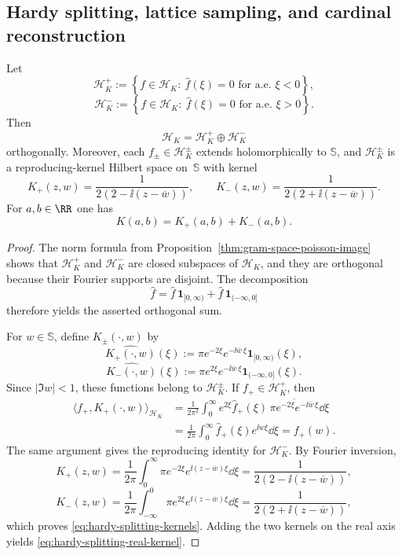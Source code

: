 \subsection{Hardy splitting, lattice sampling, and cardinal reconstruction}

\begin{proposition}%
\label{prop:poisson-hardy-splitting}
Let
\[
\mathcal H_K^+
:=
\left\{
f\in\mathcal H_K:\ \widehat f(\xi)=0 \text{ for a.e. }\xi<0
\right\},
\]
\[
\mathcal H_K^-
:=
\left\{
f\in\mathcal H_K:\ \widehat f(\xi)=0 \text{ for a.e. }\xi>0
\right\}.
\]
Then
\[
\mathcal H_K=\mathcal H_K^+\oplus \mathcal H_K^-
\]
orthogonally.  Moreover, each $f_\pm\in\mathcal H_K^\pm$ extends
holomorphically to $\mathbb S$, and $\mathcal H_K^\pm$ is a
reproducing-kernel Hilbert space on~$\mathbb S$ with kernel
\begin{equation}\label{eq:hardy-splitting-kernels}
K_+(z,w)=\frac{1}{2(2-\ii(z-\overline w))},
\qquad
K_-(z,w)=\frac{1}{2(2+\ii(z-\overline w))}.
\end{equation}
For $a,b\in\RR$ one has
\begin{equation}\label{eq:hardy-splitting-real-kernel}
K(a,b)=K_+(a,b)+K_-(a,b).
\end{equation}
\end{proposition}

\begin{proof}
The norm formula from Proposition~\ref{thm:gram-space-poisson-image}
shows that $\mathcal H_K^+$ and $\mathcal H_K^-$ are closed subspaces of
$\mathcal H_K$, and they are orthogonal because their Fourier supports are
disjoint.  The decomposition
\[
\widehat f
=\widehat f\,\mathbf 1_{[0,\infty)}
+\widehat f\,\mathbf 1_{(-\infty,0]}
\]
therefore yields the asserted orthogonal sum.

For $w\in\mathbb S$, define $K_\pm(\cdot,w)$ by
\[
\widehat{K_+(\cdot,w)}(\xi)
:=
\pi e^{-2\xi}e^{-\ii\overline w\,\xi}\mathbf 1_{[0,\infty)}(\xi),
\]
\[
\widehat{K_-(\cdot,w)}(\xi)
:=
\pi e^{2\xi}e^{-\ii\overline w\,\xi}\mathbf 1_{(-\infty,0]}(\xi).
\]
Since $|\Im w|<1$, these functions belong to $\mathcal H_K^\pm$.  If
$f_+\in\mathcal H_K^+$, then
\begin{align*}
\langle f_+,K_+(\cdot,w)\rangle_{\mathcal H_K}
&=
\frac{1}{2\pi^2}\int_0^\infty
e^{2\xi}\widehat f_+(\xi)\,
\overline{\pi e^{-2\xi}e^{-\ii\overline w\,\xi}}\dd\xi \\
&=
\frac{1}{2\pi}\int_0^\infty \widehat f_+(\xi)e^{\ii w\xi}\dd\xi
=f_+(w).
\end{align*}
The same argument gives the reproducing identity for $\mathcal H_K^-$.  By
Fourier inversion,
\[
K_+(z,w)
=\frac{1}{2\pi}\int_0^\infty
\pi e^{-2\xi}e^{\ii(z-\overline w)\xi}\dd\xi
=\frac{1}{2(2-\ii(z-\overline w))},
\]
\[
K_-(z,w)
=\frac{1}{2\pi}\int_{-\infty}^0
\pi e^{2\xi}e^{\ii(z-\overline w)\xi}\dd\xi
=\frac{1}{2(2+\ii(z-\overline w))},
\]
which proves \eqref{eq:hardy-splitting-kernels}.  Adding the two kernels
on the real axis yields \eqref{eq:hardy-splitting-real-kernel}.
\end{proof}

